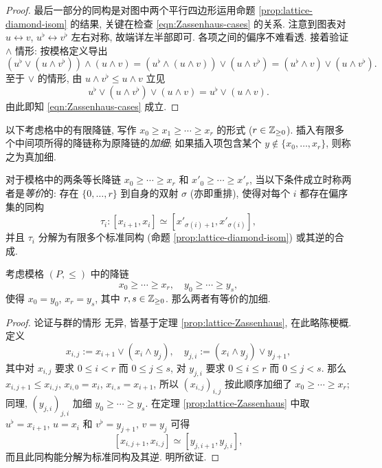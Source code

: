 \begin{proof}
	最后一部分的同构是对图中两个平行四边形运用命题 \ref{prop:lattice-diamond-isom} 的结果, 关键在检查 \eqref{eqn:Zassenhaus-cases} 的关系. 注意到图表对 $u \leftrightarrow v$, $u^\flat \leftrightarrow v^\flat$ 左右对称, 故端详左半部即可. 各项之间的偏序不难看透. 接着验证 $\wedge$ 情形: 按模格定义导出
	\begin{equation*}
		\left( u^\flat \vee (u \wedge v^\flat)\right) \wedge (u \wedge v) = \left( u^\flat \wedge (u \wedge v) \right) \vee (u \wedge v^\flat) = (u^\flat \wedge v) \vee (u \wedge v^\flat).
	\end{equation*}
	至于 $\vee$ 的情形, 由 $u \wedge v^\flat \leq u \wedge v$ 立见
	\begin{equation*}
		u^\flat \vee (u \wedge v^\flat) \vee (u \wedge v) = u^\flat \vee (u \wedge v). 
	\end{equation*}
	由此即知 \eqref{eqn:Zassenhaus-cases} 成立.
\end{proof}

以下考虑格中的有限降链, 写作 $x_0 \geq x_1 \geq \cdots \geq x_r$ 的形式 ($r \in \mathbb{Z}_{\geq 0}$). 插入有限多个中间项所得的降链称为原降链的\emph{加细}; 如果插入项包含某个 $y \notin \{x_0, \ldots, x_r\}$, 则称之为真加细.

\begin{definition}\label{def:Schreier-equiv}
	对于模格中的两条等长降链 $x_0 \geq \cdots \geq x_r$ 和 $x'_0 \geq \cdots \geq x'_r$, 当以下条件成立时称两者是\emph{等价}的: 存在 $\{0, \ldots, r\}$ 到自身的双射 $\sigma$ (亦即重排), 使得对每个 $i$ 都存在偏序集的同构
	\[ \tau_i: \left[ x_{i+1}, x_i \right] \simeq \left[ x'_{\sigma(i) + 1}, x'_{\sigma(i)} \right], \]
	并且 $\tau_i$ 分解为有限多个标准同构 (命题 \ref{prop:lattice-diamond-isom}) 或其逆的合成.
\end{definition}

\begin{theorem}\label{prop:Schreier-refinement}
	考虑模格 $(P, \leq)$ 中的降链
	\[ x_0 \geq \cdots \geq x_r, \quad y_0 \geq \cdots \geq y_s, \]
	使得 $x_0 = y_0$, $x_r = y_s$, 其中 $r, s \in \mathbb{Z}_{\geq 0}$. 那么两者有等价的加细.
\end{theorem}
\begin{proof}
	论证与群的情形 \cite[定理 4.6.6]{Li1} 无异, 皆基于定理 \ref{prop:lattice-Zassenhaus}, 在此略陈梗概. 定义
	\[ x_{i, j} := x_{i+1} \vee (x_i \wedge y_j), \quad y_{j, i} := (x_i \wedge y_j) \vee y_{j+1}, \]
	其中对 $x_{i, j}$ 要求 $0 \leq i < r$ 而 $0 \leq j \leq s$, 对 $y_{j, i}$ 要求 $0 \leq i \leq r$ 而 $0 \leq j < s$. 那么 $x_{i, j+1} \leq x_{i, j}$, $x_{i, 0} = x_i$, $x_{i, s} = x_{i+1}$, 所以 $\left( x_{i,j} \right)_{i,j}$ 按此顺序加细了 $x_0 \geq \cdots \geq x_r$; 同理, $\left( y_{j,i} \right)_{j,i}$ 加细 $y_0 \geq \cdots \geq y_s$. 在定理 \ref{prop:lattice-Zassenhaus} 中取 $u^\flat = x_{i+1}$, $u = x_i$ 和 $v^\flat = y_{j+1}$, $v = y_j$ 可得
	\[ \left[ x_{i, j+1}, x_{i,j} \right] \simeq \left[ y_{j, i+1}, y_{j, i} \right], \]
	而且此同构能分解为标准同构及其逆. 明所欲证.
\end{proof}

